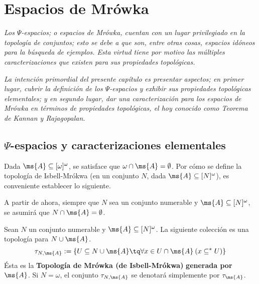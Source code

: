 \chapter{Espacios de Mrówka}\label{chap-mrowkas}
	\emph{\small Los $\Psi$-espacios; o espacios de Mrówka, cuentan con un lugar privilegiado en la topología de conjuntos; esto se debe a que son, entre otras cosas, espacios idóneos para la búsqueda de ejemplos. Esta virtud tiene por motivo las múltiples caracterizaciones que existen para sus propiedades topológicas.}
	
	\emph{\small La intención primordial del presente capítulo es presentar aspectos; en primer lugar, cubrir la definición de los $\Psi$-espacios y exhibir sus propiedades topológicas elementales; y en segundo lugar, dar una caracterización para los espacios de Mrówka en términos de propiedades topológicas, el hoy conocido como Teorema de Kannan y Rajagopalan.}

\section{\texorpdfstring{$\Psi$-espacios y caracterizaciones elementales}{Psi-espacios y caracterizaciones elementales}}
	
	Dada $\ms{A} \subseteq [\omega]^\omega$, se satisface que $\omega \cap \ms{A} = \emptyset$. Por cómo se define la topología de Isbell-Mrókwa (en un conjunto $N$, dada $\ms{A}\subseteq[N]^\omega$), es conveniente establecer lo siguiente.
	
	\begin{consideracion}\label{cons-ajenosNyA}
		A partir de ahora, siempre que $N$ sea un conjunto numerable y $\ms{A} \subseteq [N]^\omega$, se asumirá que $N \cap \ms{A} = \emptyset$.
	\end{consideracion}
	
	\begin{proposicion}
		Sean $N$ un conjunto numerable y $\ms{A} \subseteq [N]^\omega$. La siguiente colección es una topología para $N \cup \ms{A}$.
	$$ \tau_{N,\ms{A}} := \{ U \subseteq N \cup \ms{A} \tq \forall x \in U \cap \ms{A} \: ( x \subseteq^* U ) \} $$
	Ésta es la \textbf{Topología de Mrówka (de Isbell-Mrókwa)} \textbf{generada por $\ms{A}$}. Si $N=\omega$, el conjunto $\tau_{N,\ms{A}}$ se denotará simplemente por $\tau_\ms{A}$.
	\end{proposicion}
	
